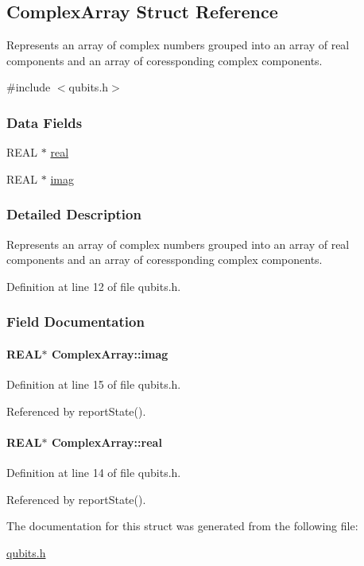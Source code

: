 \hypertarget{structComplexArray}{
\subsection{ComplexArray Struct Reference}
\label{structComplexArray}
}


Represents an array of complex numbers grouped into an array of real components and an array of coressponding complex components.  


{\ttfamily \#include $<$qubits.h$>$}\subsubsection*{Data Fields}
\begin{DoxyCompactItemize}
\item 
REAL $\ast$ \hyperlink{structComplexArray_a4195cac6c784ea1b6271f1c7dba1548a}{real}
\item 
REAL $\ast$ \hyperlink{structComplexArray_a79dde47c7ae530c79cebfdf57b225968}{imag}
\end{DoxyCompactItemize}


\subsubsection{Detailed Description}
Represents an array of complex numbers grouped into an array of real components and an array of coressponding complex components. 

Definition at line 12 of file qubits.h.

\subsubsection{Field Documentation}
\hypertarget{structComplexArray_a79dde47c7ae530c79cebfdf57b225968}{
\paragraph[{imag}]{\setlength{\rightskip}{0pt plus 5cm}REAL$\ast$ {\bf ComplexArray::imag}}\hfill}
\label{structComplexArray_a79dde47c7ae530c79cebfdf57b225968}


Definition at line 15 of file qubits.h.

Referenced by reportState().\hypertarget{structComplexArray_a4195cac6c784ea1b6271f1c7dba1548a}{
\paragraph[{real}]{\setlength{\rightskip}{0pt plus 5cm}REAL$\ast$ {\bf ComplexArray::real}}\hfill}
\label{structComplexArray_a4195cac6c784ea1b6271f1c7dba1548a}


Definition at line 14 of file qubits.h.

Referenced by reportState().

The documentation for this struct was generated from the following file:\begin{DoxyCompactItemize}
\item 
\hyperlink{qubits_8h}{qubits.h}\end{DoxyCompactItemize}
